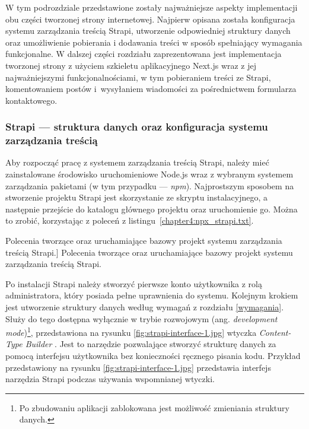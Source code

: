 \documentclass[a4paper, 12pt, twoside]{article}
\numberwithin{figure}{section}
\begin{document}
\begin{sloppypar}
W tym podrozdziale przedstawione zostały najważniejsze aspekty implementacji obu części tworzonej strony internetowej. Najpierw opisana została konfiguracja systemu zarządzania treścią Strapi, utworzenie odpowiedniej struktury danych oraz umożliwienie pobierania i dodawania treści w sposób spełniający wymagania funkcjonalne. W dalszej części rozdziału zaprezentowana jest implementacja tworzonej strony z użyciem szkieletu aplikacyjnego Next.js wraz z jej najważniejszymi funkcjonalnościami, w tym pobieraniem treści ze Strapi, komentowaniem postów i~wysyłaniem wiadomości za pośrednictwem formularza kontaktowego.

\subsubsection{Strapi --- struktura danych oraz konfiguracja systemu zarządzania treścią}

Aby rozpocząć pracę z systemem zarządzania treścią Strapi, należy mieć zainstalowane środowisko uruchomieniowe Node.js wraz z wybranym systemem zarządzania pakietami (w tym przypadku --- \textit{npm}). Najprostszym sposobem na stworzenie projektu Strapi jest skorzystanie ze skryptu instalacyjnego, a następnie przejście do katalogu głównego projektu oraz uruchomienie go. Można to zrobić, korzystając z poleceń z listingu~\ref{chapter4:npx_strapi.txt}.

\begin{code}[htbp]
    
    \caption
    [Polecenia tworzące oraz uruchamiające bazowy projekt systemu zarządzania treścią Strapi.]
    {Polecenia tworzące oraz uruchamiające bazowy projekt systemu zarządzania treścią Strapi.}
    \label{chapter4:npx_strapi.txt}
\end{code}

Po instalacji Strapi należy stworzyć pierwsze konto użytkownika z rolą administratora, który posiada pełne uprawnienia do systemu. Kolejnym krokiem jest utworzenie struktury danych według wymagań z rozdziału \ref{wymagania}. Służy do tego dostępna wyłącznie w trybie rozwojowym (ang. \textit{development mode})\footnote{Po zbudowaniu aplikacji zablokowana jest możliwość zmieniania struktury danych.}, przedstawiona na rysunku \ref{fig:strapi-interface-1.jpg} wtyczka \textit{Content-Type Builder} \cite{strapidocs}. Jest to narzędzie pozwalające stworzyć strukturę danych za pomocą interfejsu użytkownika bez konieczności ręcznego pisania kodu. Przykład przedstawiony na rysunku \ref{fig:strapi-interface-1.jpg} przedstawia interfejs narzędzia Strapi podczas używania wspomnianej wtyczki. 


\end{sloppypar}
\end{document}
